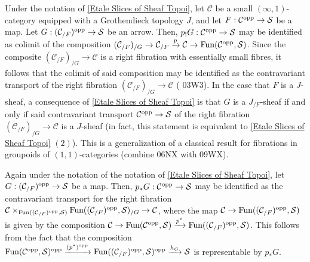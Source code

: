 \documentclass[10pt]{article}
\newcommand{\mS}{\mathcal S}
\newcommand{\C}{\mathcal C}
\theoremstyle{witharg}
\theoremstyle{witharg}
\theoremstyle{witharg2}
\begin{document}
\begin{remark}{}\label{Left Kan extensions of slice sheaves are sheaves}

    Under the notation of \ref{Etale Slices of Sheaf Topoi}, let $\C$ be a small $(\infty,1)$-category equipped with a Grothendieck topology $J$, and let $F:\C^{\textnormal{opp}}\rightarrow \mS$ be a map. Let $G:(\C_{/F})^{\textnormal{opp}}\rightarrow \mS$ be an arrow. Then, $p_!G:\C^{\textnormal{opp}}\rightarrow \mS$ may be identified as colimit of the composition $(\C_{/F})_{/G}\rightarrow \C_{/F}\xrightarrow{p}  \C \rightarrow \textnormal{Fun}(\C^{\textnormal{opp}},\mS)$. Since the composite $(\C_{/F})_{/G}\rightarrow \C$ is a right fibration with essentially small fibres, it follows that the colimit of said composition may be identified as the contravariant transport of the right fibration $(\C_{/F})_{/G}\rightarrow \C$ ( 03W3). In the case that $F$ is a $J$-sheaf, a consequence of \ref{Etale Slices of Sheaf Topoi} is that $G$ is a $J_{/F}$-sheaf if and only if said contravariant transport $\C^{\textnormal{opp}}\rightarrow \mS$ of the right fibration $(\C_{/F})_{/G}\rightarrow \C$ is a $J$-sheaf (in fact, this statement is equivalent to \ref{Etale Slices of Sheaf Topoi} $(2)$). This is a generalization of a classical result for fibrations in groupoids of $(1,1)$-categories (combine  06NX with  09WX).
    
    
\end{remark}



\begin{remark}{}

    Again under the notation of the notation of \ref{Etale Slices of Sheaf Topoi}, let $G:(\C_{/F})^{\textnormal{opp}}\rightarrow \mS$ be a map. Then, $p_*G:\C^{\textnormal{opp}}\rightarrow \mS$ may be identified as the contravariant transport for the right fibration $\C\times_{\textnormal{Fun}((\C_{/F})^{\textnormal{opp}},\mS)}\textnormal{Fun}((\C_{/F})^{\textnormal{opp}},\mS)_{/G}\rightarrow \C$, where the map $\C\rightarrow \textnormal{Fun}((\C_{/F})^{\textnormal{opp}},\mS)$ is given by the composition $\C\rightarrow \textnormal{Fun}(\C^{\textnormal{opp}},\mS)\xrightarrow{p^*}\textnormal{Fun}((\C_{/F})^{\textnormal{opp}},\mS)$. This follows from the fact that the composition $\textnormal{Fun}(\C^{\textnormal{opp}},\mS)^{\textnormal{opp}}\xrightarrow{(p^*)^{\textnormal{opp}}}\textnormal{Fun}((\C_{/F})^{\textnormal{opp}},\mS)^{\textnormal{opp}}\xrightarrow{h_G}\mS$ is representable by $p_*G$.
    
\end{remark}
\end{document}
